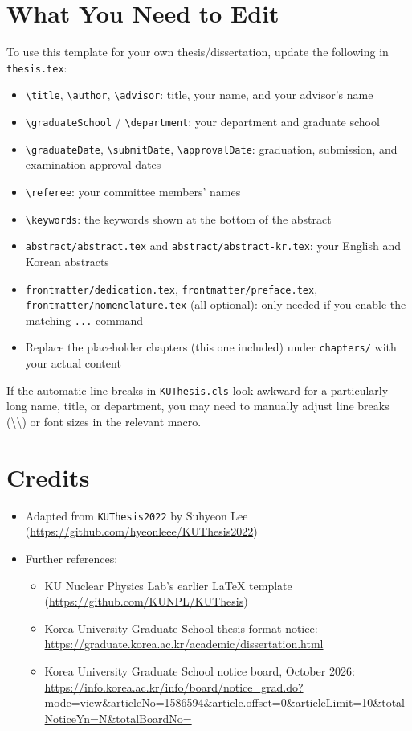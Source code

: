 \section{What You Need to Edit}
To use this template for your own thesis/dissertation, update the following in \texttt{thesis.tex}:
\begin{itemize}
  \item \texttt{\textbackslash title}, \texttt{\textbackslash author}, \texttt{\textbackslash advisor}: title, your name, and your advisor's name
  \item \texttt{\textbackslash graduateSchool} / \texttt{\textbackslash department}: your department and graduate school
  \item \texttt{\textbackslash graduateDate}, \texttt{\textbackslash submitDate}, \texttt{\textbackslash approvalDate}: graduation, submission, and examination-approval dates
  \item \texttt{\textbackslash referee}: your committee members' names
  \item \texttt{\textbackslash keywords}: the keywords shown at the bottom of the abstract
  \item \texttt{abstract/abstract.tex} and \texttt{abstract/abstract-kr.tex}: your English and Korean abstracts
  \item \texttt{frontmatter/dedication.tex}, \texttt{frontmatter/preface.tex}, \texttt{frontmatter/nomenclature.tex} (all optional): only needed if you enable the matching \verb|...| command
  \item Replace the placeholder chapters (this one included) under \texttt{chapters/} with your actual content
\end{itemize}

If the automatic line breaks in \texttt{KUThesis.cls} look awkward for a particularly long name, title, or department, you may need to manually adjust line breaks (\textbackslash\textbackslash) or font sizes in the relevant macro.

\section{Credits}
\begin{itemize}
    \item Adapted from \texttt{KUThesis2022} by Suhyeon Lee (\url{https://github.com/hyeonleee/KUThesis2022})
    \item Further references:
    \begin{itemize}
        \item KU Nuclear Physics Lab's earlier LaTeX template (\url{https://github.com/KUNPL/KUThesis})
        \item Korea University Graduate School thesis format notice: \url{https://graduate.korea.ac.kr/academic/dissertation.html}
        \item Korea University Graduate School notice board, October 2026: \url{https://info.korea.ac.kr/info/board/notice_grad.do?mode=view&articleNo=1586594&article.offset=0&articleLimit=10&totalNoticeYn=N&totalBoardNo=}
    \end{itemize}
\end{itemize}

